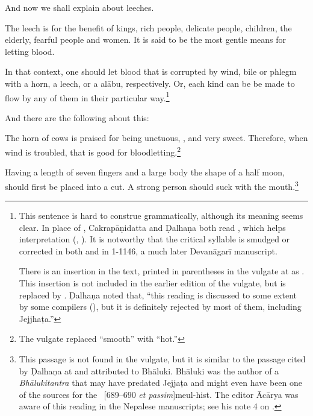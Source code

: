 \begin{translation}    
\item [1] 
    And now we shall explain  about leeches.
    
\item [3] The leech is for the benefit of kings, rich people, delicate people,
children, the elderly, fearful people and women.  It is said to be the most
gentle means for letting blood.

\item [4]

In that context, one should let blood that is corrupted by wind, bile or
phlegm with a horn, a leech, or a \gls{alābu}, respectively.   Or, each kind
can be be made to flow by any of them in their particular way.\footnote{This
    sentence is hard to construe grammatically, although its meaning seems
    clear. In place of , Cakrapāṇidatta and Ḍalhaṇa both read
    , which helps interpretation (\cite[95]{acar-1939},
    \cite[55]{vulgate}). It is notworthy that the critical syllable  is
    smudged or corrected in both  and in 1-1146, a
    much later Devanāgarī manuscript.
      
There is an insertion in the text, printed in parentheses in the
vulgate at  as  .  This insertion is not included in the
earlier edition of the vulgate, but is replaced by
 \citep[54]{susr-trikamji2}. Ḍalhaṇa noted that,
“this reading is discussed to some extent by some compilers
(), but it is definitely rejected by most of them,
including Jejjhaṭa.” }

\item[1.13.5x]  And there are the following about this:

\item [1.13.5]

The horn of cows is praised for being unctuous, , and very
sweet.  Therefore, when wind is troubled, that is good for
bloodletting.\footnote{The vulgate replaced “smooth” with “hot.”}

\item [1.13.5a]

Having a length of seven fingers and a large body the shape of a half moon,
should first be placed into a cut.  A strong person should suck with the
mouth.\footnote{This passage is not found in the vulgate, but it is similar
    to the passage cited by Ḍalhaṇa at  and attributed to
    Bhāluki.  Bhāluki was the author of a \emph{Bhālukitantra} that may have
    predated Jejjaṭa and might even have been one of the sources for the \SS\
    [689--690 \emph{et passim}]{meul-hist}. The editor Ācārya was
    aware of this reading in the Nepalese manuscripts; see his note 4 on
    \Su{1.13.5}{55, note 4}.}


\end{translation}
